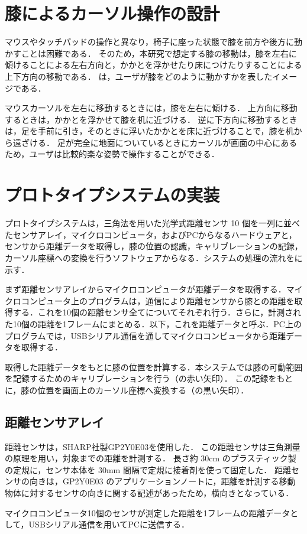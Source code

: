 \documentclass[submit, techrep]{ipsj}
\begin{document}
\section{膝によるカーソル操作の設計}
マウスやタッチパッドの操作と異なり，椅子に座った状態で膝を前方や後方に動かすことは困難である．
そのため，本研究で想定する膝の移動は，膝を左右に傾けることによる左右方向と，かかとを浮かせたり床につけたりすることによる上下方向の移動である．
は，ユーザが膝をどのように動かすかを表したイメージである．

マウスカーソルを左右に移動するときには，膝を左右に傾ける．
上方向に移動するときは，かかとを浮かせて膝を机に近づける．
逆に下方向に移動するときは，足を手前に引き，そのときに浮いたかかとを床に近づけることで，膝を机から遠ざける．
足が完全に地面についているときにカーソルが画面の中心にあるため，ユーザは比較的楽な姿勢で操作することができる．

\section{プロトタイプシステムの実装}
プロトタイプシステムは，三角法を用いた光学式距離センサ 10 個を一列に並べたセンサアレイ，マイクロコンピュータ，およびPCからなるハードウェアと，センサから距離データを取得し，膝の位置の認識，キャリブレーションの記録，カーソル座標への変換を行うソフトウェアからなる．システムの処理の流れをに示す．\par
まず距離センサアレイからマイクロコンピュータが距離データを取得する．マイクロコンピュータ上のプログラムは，\iic 通信により距離センサから膝との距離を取得する．これを10個の距離センサ全てについてそれぞれ行う．さらに，計測された10個の距離を1フレームにまとめる．以下，これを距離データと呼ぶ．PC上のプログラムでは，USBシリアル通信を通してマイクロコンピュータから距離データを取得する．\par
取得した距離データをもとに膝の位置を計算する．本システムでは膝の可動範囲を記録するためのキャリブレーションを行う（の赤い矢印）．
この記録をもとに，膝の位置を画面上のカーソル座標へ変換する（の黒い矢印）．


\subsection{距離センサアレイ}
距離センサは，SHARP社製GP2Y0E03を使用した．
この距離センサは三角測量の原理を用い，対象までの距離を計測する．
長さ約 30cm のプラスティック製の定規に，センサ本体を 30mm 間隔で定規に接着剤を使って固定した．
距離センサの向きは，GP2Y0E03 のアプリケーションノートに，距離を計測する移動物体に対するセンサの向きに関する記述があったため，横向きとなっている．\par
マイクロコンピュータ10個のセンサが測定した距離を1フレームの距離データとして，USBシリアル通信を用いてPCに送信する．
\end{document}
